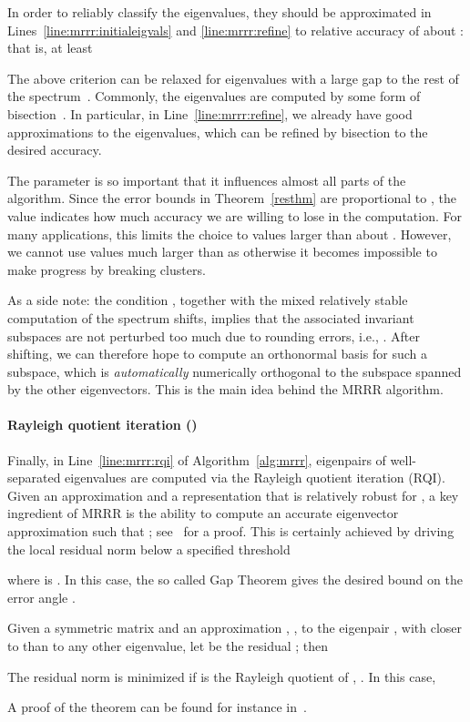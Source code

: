 \documentclass[final]{siamltex}
\begin{document}
In order to reliably classify the
eigenvalues, they should be approximated in
Lines~\ref{line:mrrr:initialeigvals} and \ref{line:mrrr:refine} to relative
accuracy of about : that is, at least 

The above criterion can be relaxed for
eigenvalues with a large gap to the rest of the
spectrum~\cite{DesignMRRR}. Commonly, the 
eigenvalues are computed by some form of 
bisection~\cite{Parlett:1998:SEP}. In 
particular, in Line~\ref{line:mrrr:refine}, we already have good
approximations to the eigenvalues, which can be refined by bisection to the
desired accuracy. 

The parameter  is so important that it influences almost all parts
of the algorithm. Since the error bounds in Theorem~\ref{resthm} are
proportional to , the value indicates how much accuracy we are willing to lose in the
computation. For many applications, this limits the choice to values larger than about
. However, we cannot use values much larger than
 as otherwise it becomes impossible to make progress by breaking
clusters. 

As a side note: the condition , together with the mixed
relatively stable computation of the spectrum shifts, implies that the
associated invariant subspaces are not 
perturbed too much due to rounding
errors, i.e., . After shifting, we can
therefore hope to compute an orthonormal 
basis for such a subspace, which is {\it automatically} numerically
orthogonal to the subspace spanned by the other eigenvectors. This is the
main idea behind the MRRR algorithm.


\paragraph{Rayleigh quotient iteration ()}

Finally, in Line~\ref{line:mrrr:rqi} of Algorithm~\ref{alg:mrrr}, eigenpairs of well-separated
eigenvalues are computed via the Rayleigh quotient iteration (RQI).  
Given an approximation  and a representation  that
is relatively robust for , a key ingredient of MRRR is the ability to
compute an accurate eigenvector approximation  such that ; see~\cite{Dhillon:2004:Ortvecs} for a
proof. This is certainly achieved by driving the local residual 
norm below a specified threshold

where  is . 
In this case, the so called Gap Theorem gives the desired bound on the error
angle . 
\begin{theorem}
Given a symmetric matrix  and an approximation , , 
to the eigenpair , with  closer to  than to any other eigenvalue,
let  
be the residual ; then

The residual norm is minimized if  is the Rayleigh quotient
of , . In 
this case, 

\label{thm:gapthm}
\end{theorem}
A proof of the theorem can be found for instance in~\cite{Parlett:1998:SEP,Willems:Diss}. 
\end{document}
